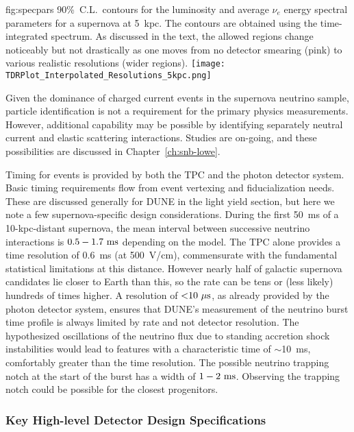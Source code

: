 \begin{dunefigure}
{fig:specpars}
{90\%~C.L.\ contours for the luminosity and average $\nu_e$ energy
spectral parameters for a supernova
at 5~kpc.  The contours are obtained using the time-integrated
spectrum.  As discussed in the text, the allowed regions
change noticeably but not drastically as one moves from
no detector smearing (pink) to various realistic resolutions (wider regions).}
  \texttt{[image: TDRPlot\_Interpolated\_Resolutions\_5kpc.png]}
\end{dunefigure}

Given the dominance of \nue{} charged current events in the
supernova neutrino sample, particle identification is not a
requirement for the primary physics measurements.  However,
additional capability may be possible by identifying separately
neutral current and elastic scattering interactions.  Studies
are on-going, and these possibilities are discussed in 
Chapter~\ref{ch:snb-lowe}.

Timing for  events is provided by both the
TPC and the photon detector system.  Basic timing requirements
flow from event vertexing and fiducialization needs.  These are
discussed generally for DUNE in the light yield section, but
here we note a few supernova-specific design considerations.
During the first 50~ms of a 10-kpc-distant supernova, the
mean interval between successive neutrino interactions is
$0.5 - 1.7~\rm{ms}$ depending on the model.  The TPC alone
provides a time resolution of 0.6~ms (at 500~V/cm), commensurate
with the fundamental statistical limitations at this distance.
However nearly half of galactic supernova candidates lie closer
to Earth than this, so the rate can be tens or (less likely)
hundreds of times higher.  A resolution of $\mathord{<}10~\mu\rm{s}$,
as already provided by the photon detector system, ensures that
DUNE's measurement of the neutrino burst time profile is always
limited by rate and not detector resolution.  The hypothesized
oscillations of the neutrino flux due to standing accretion shock
instabilities would lead to features with a characteristic time
of $\sim$10~ms, comfortably greater than the time resolution.
The possible neutrino trapping notch at the start of the burst
has a width of $1 - 2~\rm{ms}$.  Observing the trapping notch
could be possible for the closest progenitors.

\subsubsection{Key High-level Detector Design Specifications}

